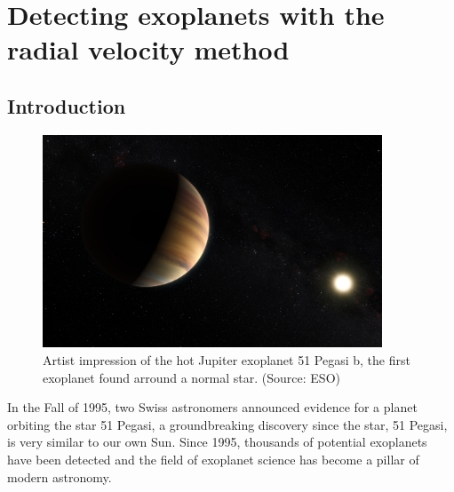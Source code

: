 \chapter{Detecting exoplanets with the radial velocity method}







\section{Introduction}

\begin{figure}
	\centering
	\includegraphics[width=0.9\textwidth]{radial-velocity/ArtistImpression_51PegB}
	\caption{Artist impression of the hot Jupiter exoplanet 51 Pegasi b, the first exoplanet found arround a normal star. (Source: ESO)}\label{rv:fig:artist-51pegb}
\end{figure}

In the Fall of 1995, two Swiss astronomers announced evidence for a planet orbiting the star 51 Pegasi, a groundbreaking discovery since the star, 51 Pegasi, is very similar to our own Sun. Since 1995, thousands of potential exoplanets have been detected and the field of exoplanet science has become a pillar of modern astronomy.

